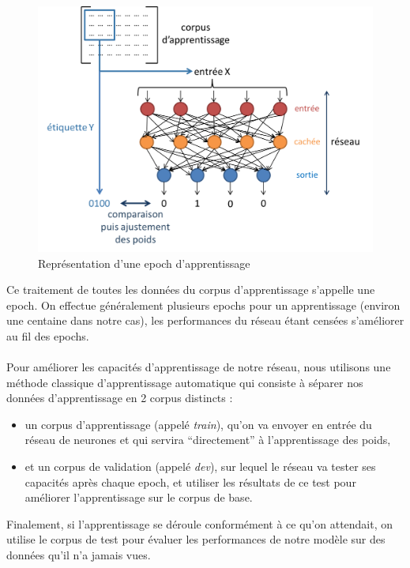 \documentclass{article}
\begin{document}
\hphantom{.}
\begin{figure}[h]
  \centerline{\includegraphics[scale=0.6]{img/schema_epoch.png}}
  \caption{Représentation d'une epoch d'apprentissage}
\end{figure}

\noindent Ce traitement de toutes les données du corpus d'apprentissage s'appelle une epoch. On effectue généralement plusieurs epochs pour un apprentissage (environ une centaine dans notre cas), les performances du réseau étant censées s'améliorer au fil des epochs. \\
 \\
Pour améliorer les capacités d'apprentissage de notre réseau, nous utilisons une méthode classique d'apprentissage automatique qui consiste à séparer nos données d'apprentissage en 2 corpus distincts : 

\begin{itemize}
\item un corpus d'apprentissage (appelé \textit{train}), qu'on va envoyer en entrée du réseau de neurones et qui servira ``directement'' à l'apprentissage des poids,
\item et un corpus de validation (appelé \textit{dev}), sur lequel le réseau va tester ses capacités après chaque epoch, et utiliser les résultats de ce test pour améliorer l'apprentissage sur le corpus de base.
\end{itemize}

\noindent Finalement, si l'apprentissage se déroule conformément à ce qu'on attendait, on utilise le corpus de test pour évaluer les performances de notre modèle sur des données qu'il n'a jamais vues.
\end{document}
